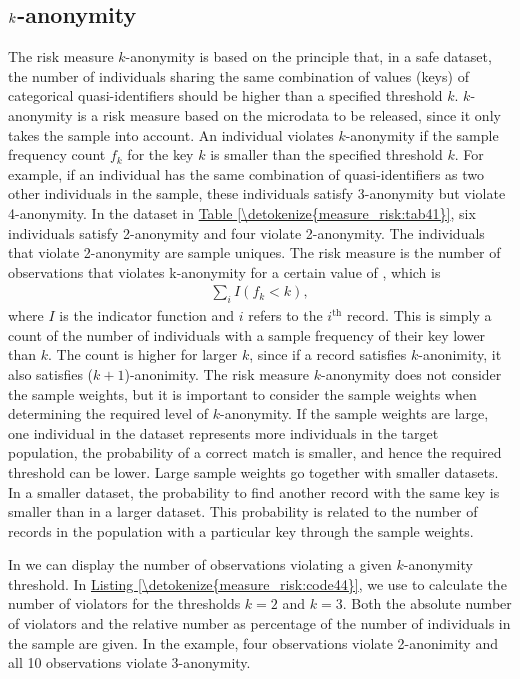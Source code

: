 \documentclass[letterpaper,10pt,english]{sphinxmanual}
\begin{document}
\subsection{\protect\(k\protect\)-anonymity}
\label{\detokenize{measure_risk:anonymity}}
The risk measure \(k\)-anonymity is based on the principle that, in a safe
dataset, the number of individuals sharing the same combination of
values (keys) of categorical quasi-identifiers should be higher than a
specified threshold \(k\). \(k\)-anonymity is a risk
measure based on the microdata to be released, since it only takes the
sample into account. An individual violates \(k\)-anonymity if the
sample frequency count \(f_{k}\) for the key \(k\) is smaller
than the specified threshold \(k\). For example, if an
individual has the same combination of quasi-identifiers as two other
individuals in the sample, these individuals satisfy 3-anonymity but
violate 4-anonymity. In the dataset in \hyperref[\detokenize{measure_risk:tab41}]{Table \ref{\detokenize{measure_risk:tab41}}}, six individuals
satisfy 2-anonymity and four violate 2-anonymity. The individuals that
violate 2-anonymity are sample uniques. The risk measure is the number
of observations that violates k-anonymity for a certain value of ,
which is
\begin{equation*}
\begin{split}\sum_{i}^{}{I(f_{k} < k)},\end{split}
\end{equation*}
where \(I\) is the indicator function and \(i\) refers to the
\(i\)$^{\text{th}}$ record. This is simply a count of the number of
individuals with a sample frequency of their key lower than \(k\).
The count is higher for larger \(k\), since if a record satisfies
\(k\)-anonimity, it also satisfies (\(k + 1\))-anonimity. The
risk measure \(k\)-anonymity does not consider the sample weights,
but it is important to consider the sample weights when determining the
required level of \(k\)-anonymity. If the sample weights are large,
one individual in the dataset represents more individuals in the target
population, the probability of a correct match is smaller, and hence the
required threshold can be lower. Large sample weights go together with
smaller datasets. In a smaller dataset, the probability to find another
record with the same key is smaller than in a larger dataset. This
probability is related to the number of records in the population with a
particular key through the sample weights.

In  we can display the number of observations violating a
given \(k\)-anonymity threshold. In \hyperref[\detokenize{measure_risk:code44}]{Listing \ref{\detokenize{measure_risk:code44}}}, we use 
to calculate the number of violators for the thresholds \(k = 2\)
and \(k = 3\). Both the absolute number of violators and the
relative number as percentage of the number of individuals in the sample
are given. In the example, four observations violate 2-anonimity and all
10 observations violate 3-anonymity.
\end{document}
